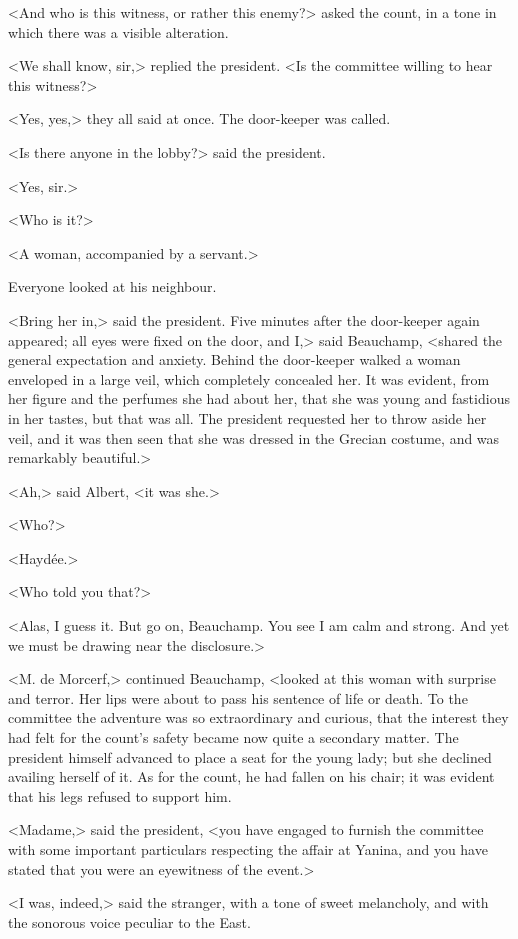 <And who is this witness, or rather this enemy?> asked the count, in a tone in which there was a visible alteration. 

<We shall know, sir,> replied the president. <Is the committee willing to hear this witness?>

<Yes, yes,> they all said at once. The door-keeper was called. 

<Is there anyone in the lobby?> said the president. 

<Yes, sir.>

<Who is it?>

<A woman, accompanied by a servant.> 

Everyone looked at his neighbour. 

<Bring her in,> said the president. Five minutes after the door-keeper again appeared; all eyes were fixed on the door, and I,> said Beauchamp, <shared the general expectation and anxiety. Behind the door-keeper walked a woman enveloped in a large veil, which completely concealed her. It was evident, from her figure and the perfumes she had about her, that she was young and fastidious in her tastes, but that was all. The president requested her to throw aside her veil, and it was then seen that she was dressed in the Grecian costume, and was remarkably beautiful.> 

 <Ah,> said Albert, <it was she.> 

 <Who?> 

 <Haydée.> 

 <Who told you that?> 

 <Alas, I guess it. But go on, Beauchamp. You see I am calm and strong. And yet we must be drawing near the disclosure.> 

 <M. de Morcerf,> continued Beauchamp, <looked at this woman with surprise and terror. Her lips were about to pass his sentence of life or death. To the committee the adventure was so extraordinary and curious, that the interest they had felt for the count's safety became now quite a secondary matter. The president himself advanced to place a seat for the young lady; but she declined availing herself of it. As for the count, he had fallen on his chair; it was evident that his legs refused to support him. 

<Madame,> said the president, <you have engaged to furnish the committee with some important particulars respecting the affair at Yanina, and you have stated that you were an eyewitness of the event.>

<I was, indeed,> said the stranger, with a tone of sweet melancholy, and with the sonorous voice peculiar to the East. 

